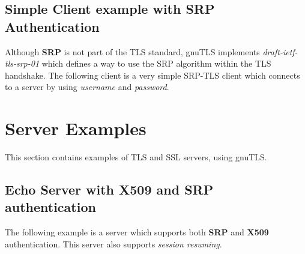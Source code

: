 \documentclass{article}
\begin{document}


\subsection{Simple Client example with SRP Authentication}
Although {\bf SRP} is not part of the TLS standard, gnuTLS implements
{\it draft-ietf-tls-srp-01} which defines a way to use the SRP algorithm
within the TLS handshake. The following client
is a very simple SRP-TLS client which connects to a server by using 
{\it username} and {\it password}.



\section{Server Examples}
This section contains examples of TLS and SSL servers, using gnuTLS.

\subsection{Echo Server with X509 and SRP authentication}
The following example is a server which supports both {\bf SRP} and {\bf X509} authentication.
This server also supports {\it session resuming}.



\end{document}
